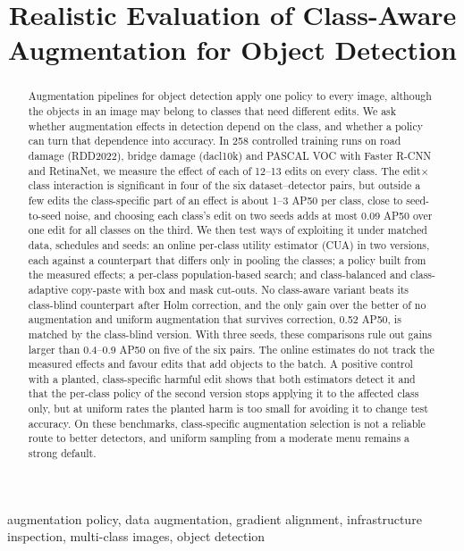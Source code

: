 \documentclass[conference]{IEEEtran}
\begin{document}
\title{Realistic Evaluation of Class-Aware Augmentation for Object Detection}
\maketitle

\begin{abstract}
Augmentation pipelines for object detection apply one policy to every image, although the objects in an image may belong to classes that need different edits. We ask whether augmentation effects in detection depend on the class, and whether a policy can turn that dependence into accuracy. In 258 controlled training runs on road damage (RDD2022), bridge damage (dacl10k) and PASCAL VOC with Faster R-CNN and RetinaNet, we measure the effect of each of 12--13 edits on every class. The edit$\times$class interaction is significant in four of the six dataset--detector pairs, but outside a few edits the class-specific part of an effect is about 1--3 AP50 per class, close to seed-to-seed noise, and choosing each class's edit on two seeds adds at most 0.09 AP50 over one edit for all classes on the third. We then test ways of exploiting it under matched data, schedules and seeds: an online per-class utility estimator (CUA) in two versions, each against a counterpart that differs only in pooling the classes; a policy built from the measured effects; a per-class population-based search; and class-balanced and class-adaptive copy-paste with box and mask cut-outs. No class-aware variant beats its class-blind counterpart after Holm correction, and the only gain over the better of no augmentation and uniform augmentation that survives correction, 0.52 AP50, is matched by the class-blind version. With three seeds, these comparisons rule out gains larger than 0.4--0.9 AP50 on five of the six pairs. The online estimates do not track the measured effects and favour edits that add objects to the batch. A positive control with a planted, class-specific harmful edit shows that both estimators detect it and that the per-class policy of the second version stops applying it to the affected class only, but at uniform rates the planted harm is too small for avoiding it to change test accuracy. On these benchmarks, class-specific augmentation selection is not a reliable route to better detectors, and uniform sampling from a moderate menu remains a strong default.
\end{abstract}

\begin{IEEEkeywords}
augmentation policy, data augmentation, gradient alignment, infrastructure inspection, multi-class images, object detection
\end{IEEEkeywords}
\end{document}

